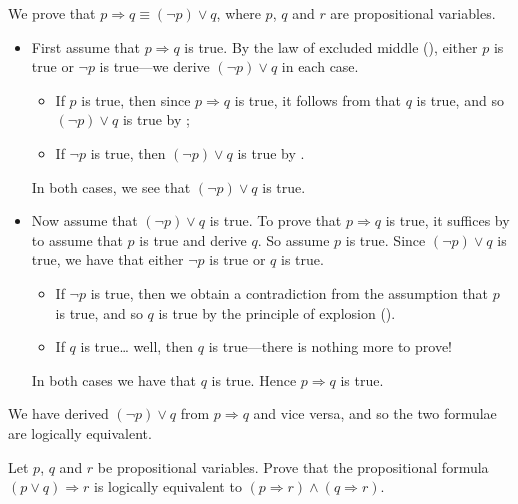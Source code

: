 \begin{example}
\label{exImplicationInTermsOfDisjunction}
We prove that $p \Rightarrow q \equiv (\neg p) \vee q$, where $p$, $q$ and $r$ are propositional variables.

\begin{itemize}
\item First assume that $p \Rightarrow q$ is true. By the law of excluded middle (), either $p$ is true or $\neg p$ is true---we derive $(\neg p) \vee q$ in each case.
\begin{itemize}
\item If $p$ is true, then since $p \Rightarrow q$ is true, it follows from \elimrule{\Rightarrow} that $q$ is true, and so $(\neg p) \vee q$ is true by ;
\item If $\neg p$ is true, then $(\neg p) \vee q$ is true by .
\end{itemize}
In both cases, we see that $(\neg p) \vee q$ is true.

\item Now assume that $(\neg p) \vee q$ is true. To prove that $p \Rightarrow q$ is true, it suffices by \introrule{\Rightarrow} to assume that $p$ is true and derive $q$. So assume $p$ is true. Since $(\neg p) \vee q$ is true, we have that either $\neg p$ is true or $q$ is true.
\begin{itemize}
\item If $\neg p$ is true, then we obtain a contradiction from the assumption that $p$ is true, and so $q$ is true by the principle of explosion ().
\item If $q$ is true\dots{} well, then $q$ is true---there is nothing more to prove!
\end{itemize}
In both cases we have that $q$ is true. Hence $p \Rightarrow q$ is true.
\end{itemize}

We have derived $(\neg p) \vee q$ from $p \Rightarrow q$ and vice versa, and so the two formulae are logically equivalent.
\end{example}

\begin{exercise}
\label{exPAndQImpliesRIffPImpliesRAndQImpliesR}
Let $p$, $q$ and $r$ be propositional variables. Prove that the propositional formula $(p \vee q) \Rightarrow r$ is logically equivalent to $(p \Rightarrow r) \wedge (q \Rightarrow r)$.
\end{exercise}

